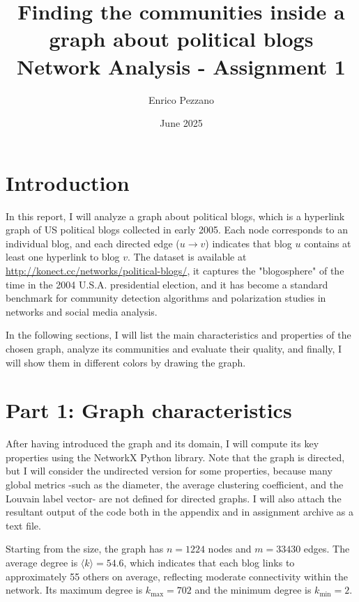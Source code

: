 \documentclass{article}
\title{
  Finding the communities inside a graph about political blogs \\
  \vspace{0.5cm}
  \large Network Analysis - Assignment 1}
\author{Enrico Pezzano}
\date{June 2025}
\begin{document}
\maketitle

\section{Introduction}\label{sec:intro}
In this report, I will analyze a graph about political blogs, which is a hyperlink graph of US political blogs collected in early 2005. 
Each node corresponds to an individual blog, and each directed edge ($u \rightarrow v$) indicates that blog $u$ contains at least one hyperlink to blog $v$. The dataset is available at \url{http://konect.cc/networks/political-blogs/}, it captures the "blogosphere" of the time in the 2004 U.S.A. presidential election, and it has become a standard benchmark for community detection algorithms and polarization studies in networks and social media analysis.

In the following sections, I will list the main characteristics and properties of the chosen graph, analyze its communities and evaluate their quality, and finally, I will show them in different colors by drawing the graph.


\section{Part 1: Graph characteristics}\label{sec:part1}
After having introduced the graph and its domain, I will compute its key properties using the NetworkX Python library. Note that the graph is directed, but I will consider the undirected version for some properties, because many global metrics -such as the diameter, the average clustering coefficient, and the Louvain label vector- are not defined for directed graphs.
I will also attach the resultant output of the code both in the appendix and in assignment archive as a text file.

Starting from the size, the graph has $n = 1224$ nodes and $m = 33430$ edges. The average degree is $\langle k \rangle = 54.6$, which indicates that each blog links to approximately 55 others on average, reflecting moderate connectivity within the network. 
Its maximum degree is $k_{\max} = 702$ and the minimum degree is $k_{\min} = 2$. 
\end{document}
